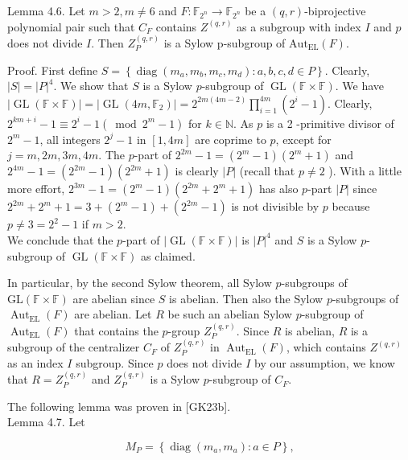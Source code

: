 \documentclass[10pt]{article}
\begin{document}
Lemma 4.6. Let $m>2, m \neq 6$ and $F: \mathbb{F}_{2^{n}} \rightarrow \mathbb{F}_{2^{n}}$ be a $(q, r)$-biprojective polynomial pair such that $C_{F}$ contains $Z^{(q, r)}$ as a subgroup with index $I$ and $p$ does not divide $I$. Then $Z_{P}^{(q, r)}$ is a Sylow p-subgroup of $\mathrm{Aut}_{\mathrm{EL}}(F)$.

Proof. First define $S=\left\{\operatorname{diag}\left(m_{a}, m_{b}, m_{c}, m_{d}\right): a, b, c, d \in P\right\}$. Clearly, $|S|=|P|^{4}$. We show that $S$ is a Sylow $p$-subgroup of $\operatorname{GL}(\mathbb{F} \times \mathbb{F})$. We have $|\operatorname{GL}(\mathbb{F} \times \mathbb{F})|=\left|\operatorname{GL}\left(4 m, \mathbb{F}_{2}\right)\right|= 2^{2 m(4 m-2)} \prod_{i=1}^{4 m}\left(2^{i}-1\right)$. Clearly, $2^{k m+i}-1 \equiv 2^{i}-1\left(\bmod 2^{m}-1\right)$ for $k \in \mathbb{N}$. As $p$ is a 2 -primitive divisor of $2^{m}-1$, all integers $2^{j}-1$ in $[1,4 m]$ are coprime to $p$, except for $j= m, 2 m, 3 m, 4 m$. The $p$-part of $2^{2 m}-1=\left(2^{m}-1\right)\left(2^{m}+1\right)$ and $2^{4 m}-1=\left(2^{2 m}-1\right)\left(2^{2 m}+1\right)$ is clearly $|P|$ (recall that $p \neq 2$ ). With a little more effort, $2^{3 m}-1=\left(2^{m}-1\right)\left(2^{2 m}+2^{m}+1\right)$ has also $p$-part $|P|$ since $2^{2 m}+2^{m}+1=3+\left(2^{m}-1\right)+\left(2^{2 m}-1\right)$ is not divisible by $p$ because $p \neq 3=2^{2}-1$ if $m>2$.\\
We conclude that the $p$-part of $|\operatorname{GL}(\mathbb{F} \times \mathbb{F})|$ is $|P|^{4}$ and $S$ is a Sylow $p$-subgroup of $\operatorname{GL}(\mathbb{F} \times \mathbb{F})$ as claimed.

In particular, by the second Sylow theorem, all Sylow $p$-subgroups of $\mathrm{GL}(\mathbb{F} \times \mathbb{F})$ are abelian since $S$ is abelian. Then also the Sylow $p$-subgroups of $\operatorname{Aut}_{\mathrm{EL}}(F)$ are abelian. Let $R$ be such an abelian Sylow $p$-subgroup of $\operatorname{Aut}_{\mathrm{EL}}(F)$ that contains the $p$-group $Z_{P}^{(q, r)}$. Since $R$ is abelian, $R$ is a subgroup of the centralizer $C_{F}$ of $Z_{P}^{(q, r)}$ in $\operatorname{Aut}_{\mathrm{EL}}(F)$, which contains $Z^{(q, r)}$ as an index $I$ subgroup. Since $p$ does not divide $I$ by our assumption, we know that $R=Z_{P}^{(q, r)}$ and $Z_{P}^{(q, r)}$ is a Sylow $p$-subgroup of $C_{F}$.

The following lemma was proven in [GK23b].\\
Lemma 4.7. Let

$$
M_{P}=\left\{\operatorname{diag}\left(m_{a}, m_{a}\right): a \in P\right\},
$$
\end{document}
